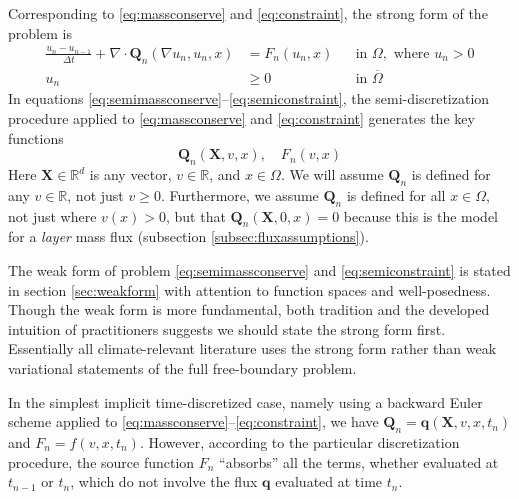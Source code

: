 \documentclass[final,leqno,onefignum,onetabnum]{siamltex1213bueler}
\newcommand\bq{\mathbf{q}}
\newcommand\bQ{\mathbf{Q}}
\newcommand\bX{\mathbf{X}}
\newcommand{\Div}{\nabla\cdot}
\renewcommand{\grad}{\nabla}
\newcommand\RR{\mathbb{R}}
\begin{document}
Corresponding to \eqref{eq:massconserve} and \eqref{eq:constraint}, the strong form of the problem is
\begin{align}
\frac{u_n - u_{n-1}}{\Delta t} + \Div \bQ_n(\grad u_n,u_n,x) &= F_n(u_n,x) &&\text{in } \Omega, \text{ where } u_n > 0 \label{eq:semimassconserve} \\
u_n &\ge 0 &&\text{in } \overline{\Omega} \label{eq:semiconstraint}
\end{align}
In equations \eqref{eq:semimassconserve}--\eqref{eq:semiconstraint}, the semi-discretization procedure applied to \eqref{eq:massconserve} and \eqref{eq:constraint} generates the key functions
\begin{equation}
\bQ_n(\bX,v,x), \quad F_n(v,x) \label{eq:functionalforms}
\end{equation}
Here $\bX\in\RR^d$ is any vector, $v\in\RR$, and $x\in \Omega$.  We will assume $\bQ_n$ is defined for any $v\in\RR$, not just $v\ge 0$.  Furthermore, we assume $\bQ_n$ is defined for all $x\in\Omega$, not just where $v(x)>0$, but that $\bQ_n(\bX,0,x)=0$ because this is the model for a \emph{layer} mass flux (subsection \ref{subsec:fluxassumptions}).

The weak form of problem \eqref{eq:semimassconserve} and \eqref{eq:semiconstraint} is stated in section \ref{sec:weakform} with attention to function spaces and well-posedness.  Though the weak form is more fundamental, both tradition and the developed intuition of practitioners suggests we should state the strong form first.  Essentially all climate-relevant literature uses the strong form rather than weak variational statements of the full free-boundary problem.

In the simplest implicit time-discretized case, namely using a backward Euler scheme applied to \eqref{eq:massconserve}--\eqref{eq:constraint}, we have $\bQ_n = \bq(\bX,v,x,t_n)$ and $F_n = f(v,x,t_n)$.  However, according to the particular discretization procedure, the source function $F_n$ ``absorbs'' all the terms, whether evaluated at $t_{n-1}$ or $t_n$, which do not involve the flux $\bq$ evaluated at time $t_n$.
\end{document}
